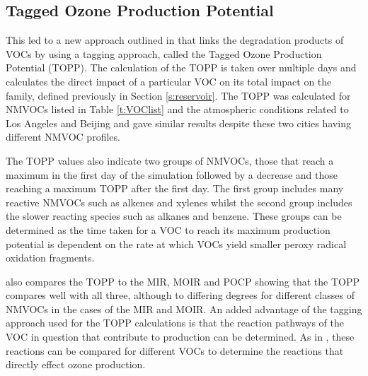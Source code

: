 \subsection{Tagged Ozone Production Potential} \label{s:TOPP}
This led to a new approach outlined in \citep{Butler:2011} that links the degradation products of VOCs by using a tagging approach, called the Tagged Ozone Production Potential (TOPP). 
The calculation of the TOPP is taken over multiple days and calculates the direct impact of a particular VOC on its total impact on the  family, defined previously in Section \ref{s:reservoir}. 
The TOPP was calculated for NMVOCs listed in Table \ref{t:VOClist} and the atmospheric conditions related to Los Angeles and Beijing and gave similar results despite these two cities having different NMVOC profiles. 

The TOPP values also indicate two groups of NMVOCs, those that reach a maximum in the first day of the simulation followed by a decrease and those reaching a maximum TOPP after the first day. 
The first group includes many reactive NMVOCs such as alkenes and xylenes whilst the second group includes the slower reacting species such as alkanes and benzene. 
These groups can be determined as the time taken for a VOC to reach its maximum  production potential is dependent on the rate at which VOCs yield smaller peroxy radical oxidation fragments. 

\citep{Butler:2011} also compares the TOPP to the MIR, MOIR and POCP showing that the TOPP compares well with all three, although to differing degrees for different classes of NMVOCs in the cases of the MIR and MOIR. 
An added advantage of the tagging approach used for the TOPP calculations is that the reaction pathways of the VOC in question that contribute to  production can be determined. 
As in \citep{Butler:2011}, these reactions can be compared for different VOCs to determine the reactions that directly effect ozone production.
